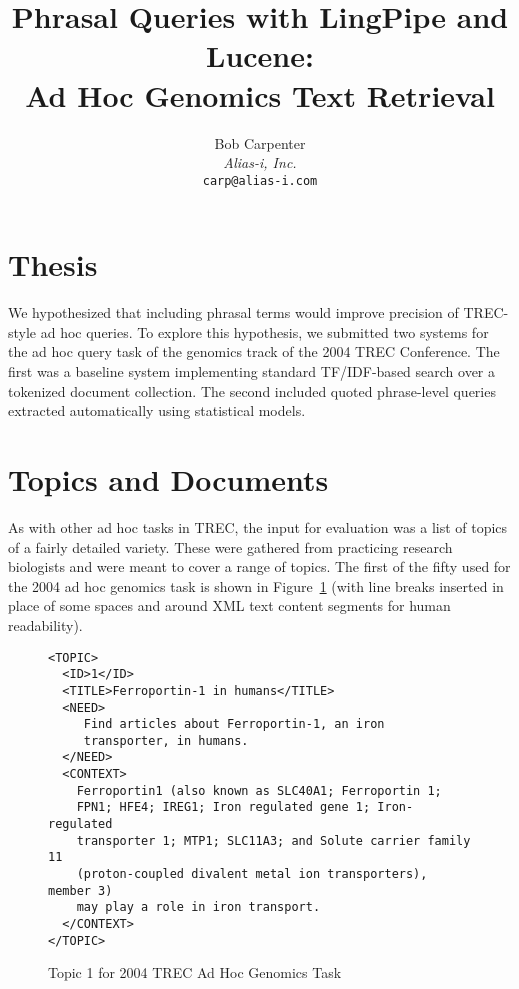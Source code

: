\documentclass[11pt,oneside]{article}
\title{Phrasal Queries with LingPipe and Lucene:
       \\ Ad Hoc Genomics Text Retrieval}
\author{Bob Carpenter 
        \\ {\small\it Alias-i, Inc.} 
        \\ {\footnotesize\tt carp@alias-i.com} }
\begin{document}
\maketitle



\section*{Thesis}

We hypothesized that including phrasal terms would improve precision
of TREC-style ad hoc queries. To explore this hypothesis, we submitted
two systems for the ad hoc query task of the genomics track of the
2004 TREC Conference.  The first was a baseline system implementing
standard TF/IDF-based search over a tokenized document collection.
The second included quoted phrase-level queries extracted
automatically using statistical models.

\section*{Topics and Documents}

As with other ad hoc tasks in TREC, the input for evaluation was a
list of topics of a fairly detailed variety.  These were gathered from
practicing research biologists and were meant to cover a range of
topics.  The first of the fifty used for the 2004 ad hoc genomics task
is shown in Figure~\ref{topic1-fig} (with line breaks inserted in
place of some spaces and around XML text content segments for human
readability).

\begin{figure}
\begin{verbatim}
<TOPIC>
  <ID>1</ID> 
  <TITLE>Ferroportin-1 in humans</TITLE> 
  <NEED>
     Find articles about Ferroportin-1, an iron 
     transporter, in humans.
  </NEED> 
  <CONTEXT>
    Ferroportin1 (also known as SLC40A1; Ferroportin 1; 
    FPN1; HFE4; IREG1; Iron regulated gene 1; Iron-regulated 
    transporter 1; MTP1; SLC11A3; and Solute carrier family 11 
    (proton-coupled divalent metal ion transporters), member 3) 
    may play a role in iron transport.
  </CONTEXT> 
</TOPIC>
\end{verbatim}
\caption{Topic 1 for 2004 TREC Ad Hoc Genomics Task}
\label{topic1-fig}
\end{figure}
\end{document}
